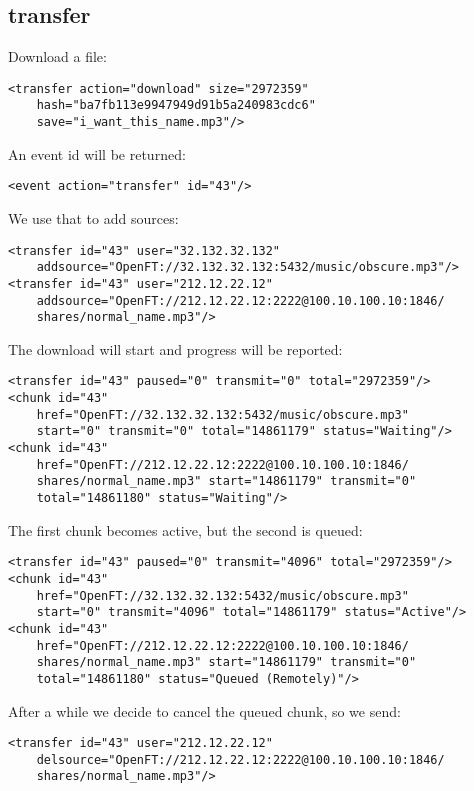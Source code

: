 \documentclass[10pt]{article}
\begin{document}
\subsection{transfer}

Download a file:
\begin{verbatim}
<transfer action="download" size="2972359"
    hash="ba7fb113e9947949d91b5a240983cdc6"
    save="i_want_this_name.mp3"/>
\end{verbatim}

An event id will be returned:
\begin{verbatim}
<event action="transfer" id="43"/>
\end{verbatim}

We use that to add sources:
\begin{verbatim}
<transfer id="43" user="32.132.32.132"
    addsource="OpenFT://32.132.32.132:5432/music/obscure.mp3"/>
<transfer id="43" user="212.12.22.12"
    addsource="OpenFT://212.12.22.12:2222@100.10.100.10:1846/
    shares/normal_name.mp3"/>
\end{verbatim}

The download will start and progress will be reported:
\begin{verbatim}
<transfer id="43" paused="0" transmit="0" total="2972359"/>
<chunk id="43"
    href="OpenFT://32.132.32.132:5432/music/obscure.mp3"
    start="0" transmit="0" total="14861179" status="Waiting"/>
<chunk id="43"
    href="OpenFT://212.12.22.12:2222@100.10.100.10:1846/
    shares/normal_name.mp3" start="14861179" transmit="0" 
    total="14861180" status="Waiting"/>
\end{verbatim}

The first chunk becomes active, but the second is queued:
\begin{verbatim}
<transfer id="43" paused="0" transmit="4096" total="2972359"/>
<chunk id="43"
    href="OpenFT://32.132.32.132:5432/music/obscure.mp3"
    start="0" transmit="4096" total="14861179" status="Active"/>
<chunk id="43"
    href="OpenFT://212.12.22.12:2222@100.10.100.10:1846/
    shares/normal_name.mp3" start="14861179" transmit="0" 
    total="14861180" status="Queued (Remotely)"/>
\end{verbatim}

After a while we decide to cancel the queued chunk, so we send:
\begin{verbatim}
<transfer id="43" user="212.12.22.12"
    delsource="OpenFT://212.12.22.12:2222@100.10.100.10:1846/
    shares/normal_name.mp3"/> 
\end{verbatim}
\end{document}
